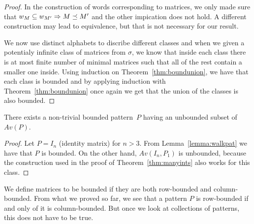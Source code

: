 \begin{proof}
In the construction of words corresponding to matrices, we only made sure that $w_M\subseteq w_{M'}\Rightarrow M\preceq M'$ and the other impication does not hold. A different construction may lead to equivalence, but that is not necessary for our result.

We now use distinct alphabets to discribe different classes and when we given a potentialy infinite class of matrices from $\sigma$, we know that inside each class there is at most finite number of minimal matrices such that all of the rest contain a smaller one inside. Using induction on Theorem~\ref{thm:boundunion}, we have that each class is bounded and by applying induction with Theorem~\ref{thm:boundunion} once again we get that the union of the classes is also bounded.
\end{proof}

\begin{obs}
There exists a non-trivial bounded pattern~$P$ having an unbounded subset of $Av(P)$.
\end{obs}
\begin{proof}
Let $P=I_n$ (identity matrix) for $n>3$. From Lemma~\ref{lemma:walkpat} we have that $P$ is bounded. On the other hand, $Av(I_n,P_1)$ is unbounded, because the construction used in the proof of Theorem~\ref{thm:manyints} also works for this class.
\end{proof}

We define matrices to be bounded if they are both row-bounded and column-bounded. From what we proved so far, we see that a pattern $P$ is row-bounded if and only of it is column-bounded. But once we look at collections of patterns, this does not have to be true.

